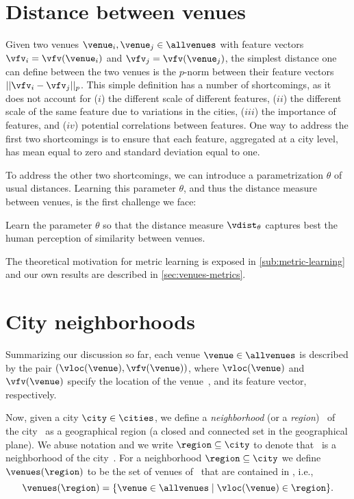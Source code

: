 \section{Distance between venues}
Given two venues $\venue_i,\venue_j\in\allvenues$ with 
feature vectors $\vfv_i = \vfv(\venue_i)$ and $\vfv_j = \vfv(\venue_j)$, 
the simplest distance one can define between the two venues is
the $p$-norm between their feature vectors $||\vfv_i-\vfv_j||_p$.
This simple definition has a number of shortcomings, as it does not
account for 
($i$) the different scale of different features, 
($ii$) the different scale of the same feature due to variations in the cities, 
($iii$) the importance of features, and 
($iv$) potential correlations between features.
One way to address the first two shortcomings is to ensure that each feature,
aggregated at a city level, has mean equal to zero and standard deviation equal
to one. 

To address the other two shortcomings, we can introduce a parametrization
$\theta$ of usual distances.  Learning this parameter $\theta$, and thus the
distance measure between venues, is the first challenge we face:
\begin{objective}
\label{objective:venue-distance-learning}
Learn the parameter $\theta$ so that the distance measure $\vdist_\theta$
captures best the human perception of similarity between venues.  
\end{objective} 
The theoretical motivation for metric learning is exposed in
\autoref{sub:metric-learning} and our
own results are described in \autoref{sec:venues-metrics}.

\section{City neighborhoods}
Summarizing our discussion so far, each venue $\venue\in\allvenues$ is
described by the pair $(\vloc(\venue), \vfv(\venue))$, where $\vloc(\venue)$
and $\vfv(\venue)$ specify the location of the venue~\venue, and its feature
vector, respectively. 

Now, given a city $\city\in\cities$, we define a {\em neighborhood} 
(or a {\em region}) \region\ of the city \city\ as a geographical region
(a closed and connected set in the geographical plane).
We abuse notation and we write $\region\subseteq\city$ to denote that
\region\ is a neighborhood of the city~\city.
For a neighborhood $\region\subseteq\city$ we define $\venues(\region)$ to
be the set of venues of \city\ that are
contained in \region, i.e., 
\begin{equation*}
\venues(\region) = \{ \venue\in\allvenues 
\mid \vloc(\venue)\in\region \}.  
\end{equation*}

